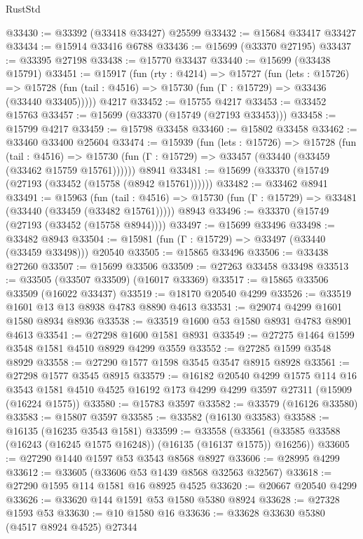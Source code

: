 \begin{lexlean}{RustStd}
\begin{coremodule}
@33430 := @33392 (@33418 @33427) @25599
@33432 := @15684 @33417 @33427
@33434 := @15914 @33416 @6788
@33436 := @15699 (@33370 @27195)
@33437 := @33395 @27198
@33438 := @15770 @33437
@33440 := @15699 (@33438 @15791)
@33451 := @15917
    (fun (rty : @4214) =>
    @15727
      (fun (lets : @15726) =>
      @15728 (fun (tail : @4516) => @15730 (fun (Γ : @15729) => @33436 (@33440 @33405)))))
    @4217
@33452 := @15755 @4217
@33453 := @33452 @15763
@33457 := @15699 (@33370 (@15749 (@27193 @33453)))
@33458 := @15799 @4217
@33459 := @15798 @33458
@33460 := @15802 @33458
@33462 := @33460 @33400 @25604
@33474 := @15939
    (fun (lets : @15726) =>
    @15728
      (fun (tail : @4516) =>
      @15730 (fun (Γ : @15729) => @33457 (@33440 (@33459 (@33462 @15759 @15761))))))
    @8941
@33481 := @15699 (@33370 (@15749 (@27193 (@33452 (@15758 (@8942 @15761))))))
@33482 := @33462 @8941
@33491 := @15963
    (fun (tail : @4516) => @15730 (fun (Γ : @15729) => @33481 (@33440 (@33459 (@33482 @15761)))))
    @8943
@33496 := @33370 (@15749 (@27193 (@33452 (@15758 @8944))))
@33497 := @15699 @33496
@33498 := @33482 @8943
@33504 := @15981 (fun (Γ : @15729) => @33497 (@33440 (@33459 @33498))) @20540
@33505 := @15865 @33496
@33506 := @33438 @27260
@33507 := @15699 @33506
@33509 := @27263 @33458 @33498
@33513 := @33505 (@33507 @33509) (@16017 @33369)
@33517 := @15865 @33506 @33509 (@16022 @33437)
@33519 := @18170 @20540 @4299
@33526 := @33519 @1601 @13 @13 @8938 @4783 @8890 @4613
@33531 := @29074 @4299 @1601 @1580 @8934 @8936
@33538 := @33519 @1600 @53 @1580 @8931 @4783 @8901 @4613
@33541 := @27298 @1600 @1581 @8931
@33549 := @27275 @1464 @1599 @3548 @1581 @4510 @8929 @4299 @3559
@33552 := @27285 @1599 @3548 @8929
@33558 := @27290 @1577 @1598 @3545 @3547 @8915 @8928
@33561 := @27298 @1577 @3545 @8915
@33579 := @16182
    @20540
    @4299
    @1575
    @114
    @16
    @3543
    @1581
    @4510
    @4525
    @16192
    @173
    @4299
    @4299
    @3597
    @27311
    (@15909 (@16224 @1575))
@33580 := @15783 @3597
@33582 := @33579 (@16126 @33580)
@33583 := @15807 @3597
@33585 := @33582 (@16130 @33583)
@33588 := @16135 (@16235 @3543 @1581)
@33599 := @33558
    (@33561 (@33585 @33588 (@16243 (@16245 @1575 @16248)) (@16135 (@16137 @1575)) @16256))
@33605 := @27290 @1440 @1597 @53 @3543 @8568 @8927
@33606 := @28995 @4299
@33612 := @33605 (@33606 @53 @1439 @8568 @32563 @32567)
@33618 := @27290 @1595 @114 @1581 @16 @8925 @4525
@33620 := @20667 @20540 @4299
@33626 := @33620 @144 @1591 @53 @1580 @5380 @8924
@33628 := @27328 @1593 @53
@33630 := @10 @1580 @16
@33636 := @33628 @33630 @5380 (@4517 @8924 @4525) @27344

\end{coremodule}
\end{lexlean}
